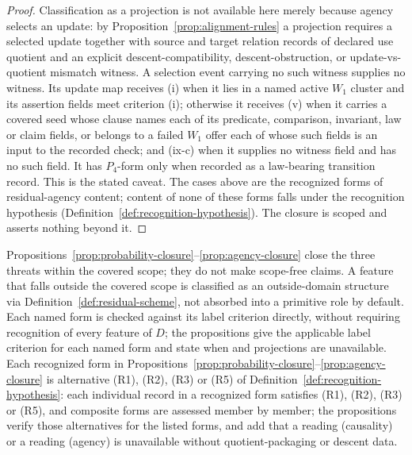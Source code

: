 \begin{proof}
Classification as a \Pone{} projection is not available here merely
because agency selects an update: by
Proposition~\ref{prop:alignment-rules} a \Pone{} projection requires a
selected update together with source and target relation records of declared use quotient and an
explicit descent-compatibility, descent-obstruction, or
update-vs-quotient mismatch witness. A selection event carrying no such
witness supplies no \Pone{} witness. Its update map receives (i) when it lies
in a named active \(W_1\) cluster and its assertion fields meet criterion (i);
otherwise it receives (v) when it carries a covered \Pone{} seed whose clause
names each of its predicate, comparison, invariant, law or claim fields, or
belongs to a failed \(W_1\) offer each of whose such fields is an input to the
recorded check; and (ix-c) when it supplies no witness field and has no such
field. It has \(P_4\)-form only when recorded as a
law-bearing transition record. This is the stated \Pone{} caveat. The cases
above are the recognized forms of residual-agency content; content of none of
these forms falls under the recognition hypothesis
(Definition~\ref{def:recognition-hypothesis}). The closure is scoped and asserts
nothing beyond it.
\end{proof}

\begin{remark}\label{rem:threat-closures-scope}
Propositions~\ref{prop:probability-closure}--\ref{prop:agency-closure}
close the three threats within the covered scope; they do not make
scope-free claims. A feature that falls outside the covered scope is
classified as an outside-domain structure via
Definition~\ref{def:residual-scheme}, not absorbed into a primitive role
by default. Each named form is checked against its label criterion directly, without
requiring recognition of every feature of \(D\); the propositions give the
applicable label criterion for each named form and state when \Pfive{} and
\Pone{} projections are unavailable. Each recognized form in
Propositions~\ref{prop:probability-closure}--\ref{prop:agency-closure} is
alternative (R1), (R2), (R3) or (R5) of Definition~\ref{def:recognition-hypothesis}:
each individual record in a recognized form satisfies (R1), (R2), (R3) or (R5), and
composite forms are assessed member by member; the propositions verify those alternatives for
the listed forms, and add that a \Pfive{} reading (causality) or a \Pone{}
reading (agency) is unavailable without quotient-packaging or descent data.
\end{remark}

